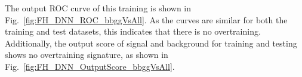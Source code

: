 



The output ROC curve of this training is shown in Fig.~\ref{fig:FH_DNN_ROC_bbggVsAll}. As the curves are similar for both the training and test datasets, this indicates that there is no overtraining. Additionally, the output score of signal and background for training and testing shows no overtraining signature,
as shown in Fig.~\ref{fig:FH_DNN_OutputScore_bbggVsAll}.


